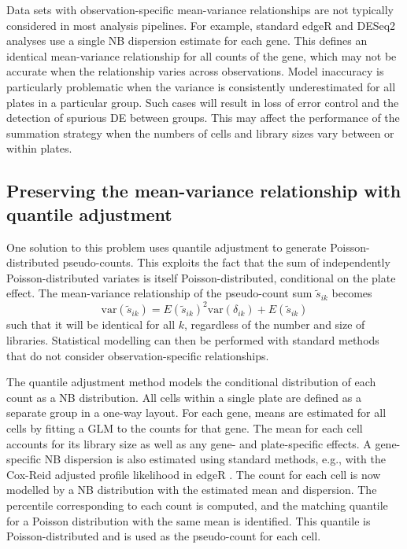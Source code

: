 \documentclass{article}
\begin{document}
Data sets with observation-specific mean-variance relationships are not typically considered in most analysis pipelines.
For example, standard edgeR and DESeq2 analyses use a single NB dispersion estimate for each gene.
This defines an identical mean-variance relationship for all counts of the gene, which may not be accurate when the relationship varies across observations.
Model inaccuracy is particularly problematic when the variance is consistently underestimated for all plates in a particular group.
Such cases will result in loss of error control and the detection of spurious DE between groups.
This may affect the performance of the summation strategy when the numbers of cells and library sizes vary between or within plates.

\subsection{Preserving the mean-variance relationship with quantile adjustment}
One solution to this problem uses quantile adjustment \cite{robinson2008small} to generate Poisson-distributed pseudo-counts.
This exploits the fact that the sum of independently Poisson-distributed variates is itself Poisson-distributed, conditional on the plate effect.
The mean-variance relationship of the pseudo-count sum $\tilde{s}_{ik}$ becomes 
\[
    \mbox{var}(\tilde{s}_{ik}) = E(\tilde{s}_{ik})^2 \mbox{var}(\delta_{ik}) + E(\tilde{s}_{ik}) 
\]
such that it will be identical for all $k$, regardless of the number and size of libraries.
Statistical modelling can then be performed with standard methods that do not consider observation-specific relationships.

The quantile adjustment method models the conditional distribution of each count as a NB distribution.
All cells within a single plate are defined as a separate group in a one-way layout.
For each gene, means are estimated for all cells by fitting a GLM to the counts for that gene.
The mean for each cell accounts for its library size as well as any gene- and plate-specific effects.
A gene-specific NB dispersion is also estimated using standard methods, e.g., with the Cox-Reid adjusted profile likelihood in edgeR \cite{mccarthy2012differential}.
The count for each cell is now modelled by a NB distribution with the estimated mean and dispersion.
The percentile corresponding to each count is computed, and the matching quantile for a Poisson distribution with the same mean is identified.
This quantile is Poisson-distributed and is used as the pseudo-count for each cell.
\end{document}
